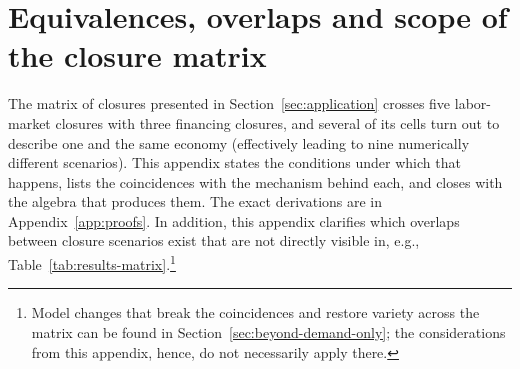 
\section{Equivalences, overlaps and scope of the closure matrix}\label{app:equivalences}

\noindent
The matrix of closures presented in Section~\ref{sec:application} crosses five
labor-market closures with three financing closures, and several of its
cells turn out to describe one and the same economy (effectively leading to nine numerically different scenarios). This appendix states the
conditions under which that happens, lists the coincidences with the
mechanism behind each, and closes with the algebra that produces them. The
exact derivations are in Appendix~\ref{app:proofs}. In addition, this appendix
clarifies which overlaps between closure scenarios exist that are not directly
visible in, e.g., Table~\ref{tab:results-matrix}.\footnote{Model changes that
break the coincidences and restore variety across the matrix can be found in
Section~\ref{sec:beyond-demand-only}; the considerations from this appendix,
hence, do not necessarily apply there.}


